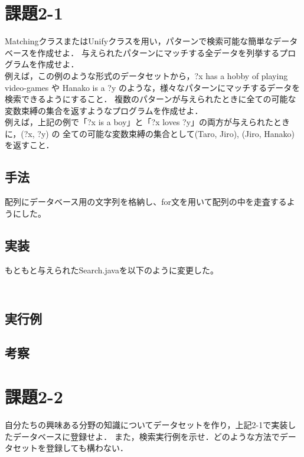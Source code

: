 \documentclass{jarticle}
\begin{document}
\section{課題2-1}
\begin{screen}
    MatchingクラスまたはUnifyクラスを用い，パターンで検索可能な簡単なデータベースを作成せよ．
    与えられたパターンにマッチする全データを列挙するプログラムを作成せよ．
    \\ 例えば，この例のような形式のデータセットから，?x has a hobby of playing video-games や 
    Hanako is a ?y のような，様々なパターンにマッチするデータを検索できるようにすること．
    複数のパターンが与えられたときに全ての可能な変数束縛の集合を返すようなプログラムを作成せよ．
    \\ 例えば，上記の例で「?x is a boy」と「?x loves ?y」の両方が与えられたときに，(?x, ?y) の
    全ての可能な変数束縛の集合として{(Taro, Jiro), (Jiro, Hanako)}を返すこと．
\end{screen}
\subsection{手法}
    配列にデータベース用の文字列を格納し、for文を用いて配列の中を走査するようにした。

\subsection{実装}

もともと与えられたSearch.javaを以下のように変更した。

\begin{lstlisting}[caption=クラスより抜粋]
\end{lstlisting}

\begin{lstlisting}[caption=結果を保存し、比較]
\end{lstlisting}

\subsection{実行例}

\subsection{考察}

\section{課題2-2}
\begin{screen}
    自分たちの興味ある分野の知識についてデータセットを作り，上記2-1で実装したデータベースに登録せよ．
    また，検索実行例を示せ．どのような方法でデータセットを登録しても構わない．
\end{screen}
\end{document}
